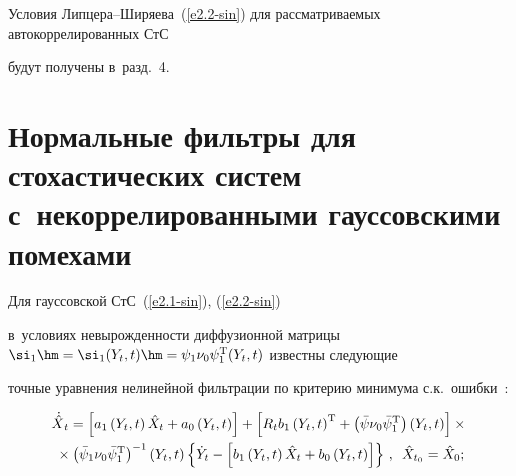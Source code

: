 Условия Липцера--Ширяева~(\ref{e2.2-sin}) для рассматриваемых автокоррелированных СтС 


будут получены в~разд.~4.





\section{Нормальные фильтры для стохастических систем с~некоррелированными гауссовскими помехами}





Для гауссовской СтС~(\ref{e2.1-sin}), (\ref{e2.2-sin}) 


в~условиях невырожденности диффузионной матрицы $\si_1\hm= \si_1 (Y_t, t) 


\hm=\psi_1\nu_0\psi_1^{\mathrm{T}} (Y_t, t)$  известны следующие 


точные уравнения нелинейной фильтрации по критерию минимума с.к.\ ошибки~\cite{2-sin}:


 \begin{multline}


 {\dot{\hat X}}_t= \left[a_1 \left(Y_t,t\right) \hat X_t + a_0 \left(Y_t,t\right)\right] 


 + \left[R_tb_1 \left(Y_t,t\right)^{\mathrm{T}} +\left(\bar \psi\nu_0\bar \psi_1^{\mathrm{T}}\right)


    \left(Y_t,t\right)\right]\times{}\\


{}\times \left(\bar \psi_1\nu_0\bar \psi_1^{\mathrm{T}}\right)^{-1} 


\left(Y_t,t\right) \left\{ \dot Y_t -\left[ b_1\left(Y_t,t\right) 


\hat X_t +b_0\left(Y_t,t\right)\right] \right\}\,,\enskip


    \hat X_{t_0} = \hat X_0;\label{e3.1-sin}


    \end{multline}


    


    


    \vspace*{-12pt}


    


    \noindent


